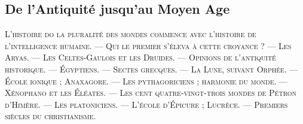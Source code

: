 \documentclass[a4paper, 11pt, oneside]{article}
\begin{document}
\bigskip

\subsection{De l'Antiquité jusqu'au Moyen Age}
\begin{center}
\scshape
\small
L'histoire do la pluralité des mondes commence avec l'histoire de l'intelligence humaine. --- Qui le premier s'éleva à cette croyance ? --- Les Aryas. --- Les Celtes-Gaulois et les Druides. --- Opinions de l'antiquité historique. --- Égyptiens. --- Sectes grecques. --- La Lune, suivant Orphée. --- École ionique ; Anaxagore. --- Les pythagoriciens ; harmonie du monde. --- Xénophano et les Éléates. --- Les cent quatre-vingt-trois mondes de Pétron d'Himère. --- Les platoniciens. --- L'école d'Épicure ; Lucrèce. --- Premiers siècles du christianisme.
\end{center}
\end{document}
